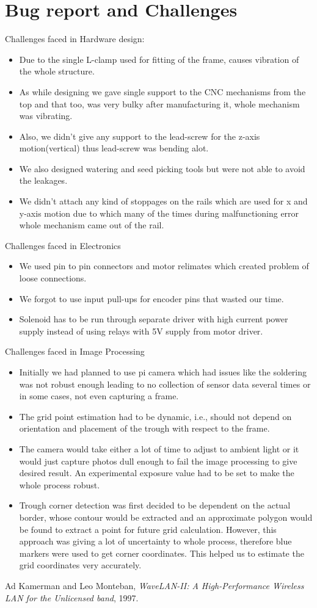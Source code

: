 \documentclass[a4paper,12pt,oneside]{book}
\begin{document}
\section{Bug report and Challenges}
Challenges faced in Hardware design:
    \begin{itemize}
        \item Due to the single L-clamp used for fitting of the frame, causes vibration of the whole structure.
        \item As while designing we gave single support to the CNC mechanisms from the top and that too, was very bulky after manufacturing it, whole mechanism was vibrating.
        \item Also, we didn't give any support to the lead-screw for the z-axis motion(vertical) thus lead-screw was bending alot.
        \item We also designed watering and seed picking tools but were not able to avoid the leakages.
        \item We didn't attach any kind of stoppages on the rails which are used for x and y-axis motion due to which many of the times during malfunctioning error whole mechanism came out of the rail.
    \end{itemize}
Challenges faced in Electronics
    \begin{itemize}
        \item We used pin to pin connectors and motor relimates which created problem of loose connections.
        \item We forgot to use input pull-ups for encoder pins that wasted our time.
        \item Solenoid has to be run through separate driver  with high current power supply instead of using relays with 5V supply from motor driver.
    \end{itemize}
Challenges faced in Image Processing 
    \begin{itemize}
        \item Initially we had planned to use pi camera which had issues like the soldering was not robust enough leading to no collection of sensor data several times or in some cases, not even capturing a frame. 
        \item The grid point estimation had to be dynamic, i.e., should not depend on orientation and placement of the trough with respect to the frame.
        \item The camera would take either a lot of time to adjust to ambient light or it would just capture photos dull enough to fail the image processing to give desired result. An experimental exposure value had to be set to make the whole process robust. 
        \item Trough corner detection was first decided to be dependent on the actual border, whose contour would be extracted and an approximate polygon would be found to extract a point for future grid calculation. However, this approach was giving a lot of uncertainty to whole process, therefore blue markers were used to get corner coordinates. This helped us to estimate the grid coordinates very accurately. 
    \end{itemize}

\begin{thebibliography}{li}
Ad Kamerman and Leo Monteban,
{\em WaveLAN-II: A High-Performance Wireless LAN for the Unlicensed band},
1997.

\end{thebibliography}
\end{document}
